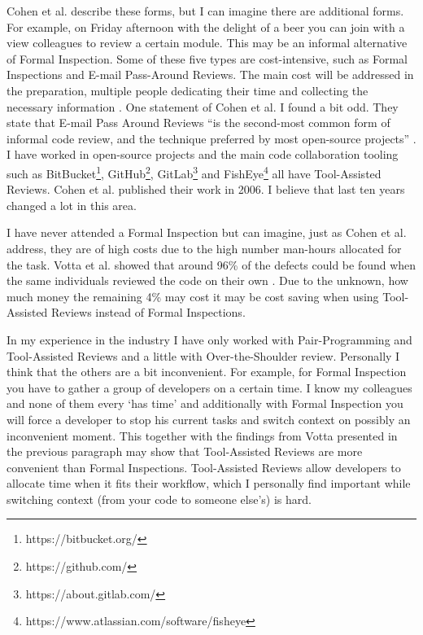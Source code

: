 Cohen et al. describe these forms, but I can imagine there are additional forms.
For example, on Friday afternoon with the delight of a beer you can join with a view colleagues to review a certain module. This may be an informal alternative of Formal Inspection.
Some of these five types are cost-intensive, such as Formal Inspections and E-mail Pass-Around Reviews.
The main cost will be addressed in the preparation, multiple people dedicating their time and collecting the necessary information \autocite[23--38]{cohen2006best}.
One statement of Cohen et al. I found a bit odd.
They state that E-mail Pass Around Reviews ``is the second-most common form of informal code review, and the technique preferred by most open-source projects'' \autocite[30]{cohen2006best}.
I have worked in open-source projects and the main code collaboration tooling such as
BitBucket\footnote{https://bitbucket.org/},
GitHub\footnote{https://github.com/},
GitLab\footnote{https://about.gitlab.com/}
and FishEye\footnote{https://www.atlassian.com/software/fisheye}
all have Tool-Assisted Reviews.
Cohen et al. published their work in 2006. I believe that last ten years changed a lot in this area.

I have never attended a Formal Inspection but can imagine, just as Cohen et al. address, they are of high costs due to the high number man-hours allocated for the task.
Votta et al. showed that around 96\% of the defects could be found when the same individuals reviewed the code on their own \autocite[110]{Votta:1993:INM:256428.167070}.
Due to the unknown, how much money the remaining 4\% may cost it may be cost saving when using Tool-Assisted Reviews instead of Formal Inspections.

In my experience in the industry I have only worked with Pair-Programming and Tool-Assisted Reviews and a little with Over-the-Shoulder review. Personally I think that the others are a bit inconvenient.
For example, for Formal Inspection you have to gather a group of developers on a certain time.
I know my colleagues and none of them every `has time' and
additionally with Formal Inspection you will force a developer to stop his current tasks and switch context on possibly an inconvenient moment.
This together with the findings from Votta presented in the previous paragraph may show that Tool-Assisted Reviews are more convenient than Formal Inspections.
Tool-Assisted Reviews allow developers to allocate time when it fits their workflow, which I personally find important while switching context (from your code to someone else's) is hard.

